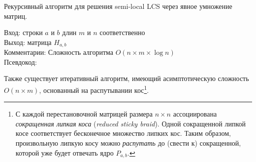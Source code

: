  \begin{algorithm}[h]
 \caption{Рекурсивный алгоритм для решения {semi-local LCS} через явное умножение матриц.}\label{alg:monge}
 Вход: строки $a$ и $b$ длин $m$ и $n$ соответственно\\
 Выход:  матрица $H_{a,b}$\\
 Комментарии: Сложность алгоритма $O(n \times m \times \log n)$\\
 Псевдокод:

 \end{algorithm}


Также существует итеративный алгоритм, имеющий асимптотическую сложность $O(n \times m)$, основанный на распутывании кос\footnote{С каждой перестановочной матрицей размера $n \times n$ ассоциирована \emph{сокращенная липкая коса} (\emph{reduced sticky braid}).
Одной {сокращенной липкой косе} соответствует бесконечное множество липких кос.
Таким образом, произвольную липкую косу можно \emph{распутать} до (свести к) сокращенной, которой уже будет отвечать ядро $P_{a,b}$.
}.


